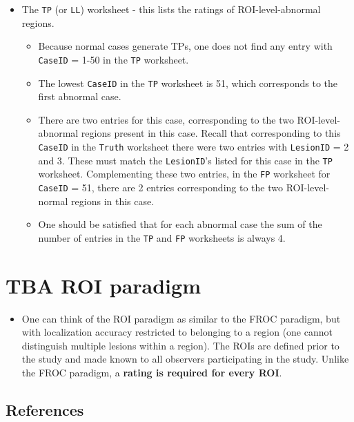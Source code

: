 \documentclass[]{book}
\providecommand{\tightlist}{%
  \setlength{\itemsep}{0pt}\setlength{\parskip}{0pt}}
\begin{document}
\begin{itemize}
\tightlist
\item
  The \texttt{TP} (or \texttt{LL}) worksheet - this lists the ratings of ROI-level-abnormal regions.

  \begin{itemize}
  \tightlist
  \item
    Because normal cases generate TPs, one does not find any entry with \texttt{CaseID} = 1-50 in the \texttt{TP} worksheet.\\
  \item
    The lowest \texttt{CaseID} in the \texttt{TP} worksheet is 51, which corresponds to the first abnormal case.\\
  \item
    There are two entries for this case, corresponding to the two ROI-level-abnormal regions present in this case. Recall that corresponding to this \texttt{CaseID} in the \texttt{Truth} worksheet there were two entries with \texttt{LesionID} = 2 and 3. These must match the \texttt{LesionID}'s listed for this case in the \texttt{TP} worksheet. Complementing these two entries, in the \texttt{FP} worksheet for \texttt{CaseID} = 51, there are 2 entries corresponding to the two ROI-level-normal regions in this case.\\
  \item
    One should be satisfied that for each abnormal case the sum of the number of entries in the \texttt{TP} and \texttt{FP} worksheets is always 4.
  \end{itemize}
\end{itemize}

\hypertarget{tba-roi-paradigm}{%
\chapter{TBA ROI paradigm}\label{tba-roi-paradigm}}

\begin{itemize}
\tightlist
\item
  One can think of the ROI paradigm as similar to the FROC paradigm, but with localization accuracy restricted to belonging to a region (one cannot distinguish multiple lesions within a region). The ROIs are defined prior to the study and made known to all observers participating in the study. Unlike the FROC paradigm, a \textbf{rating is required for every ROI}.
\end{itemize}

\hypertarget{references}{%
\section{References}\label{references}}


\end{document}

